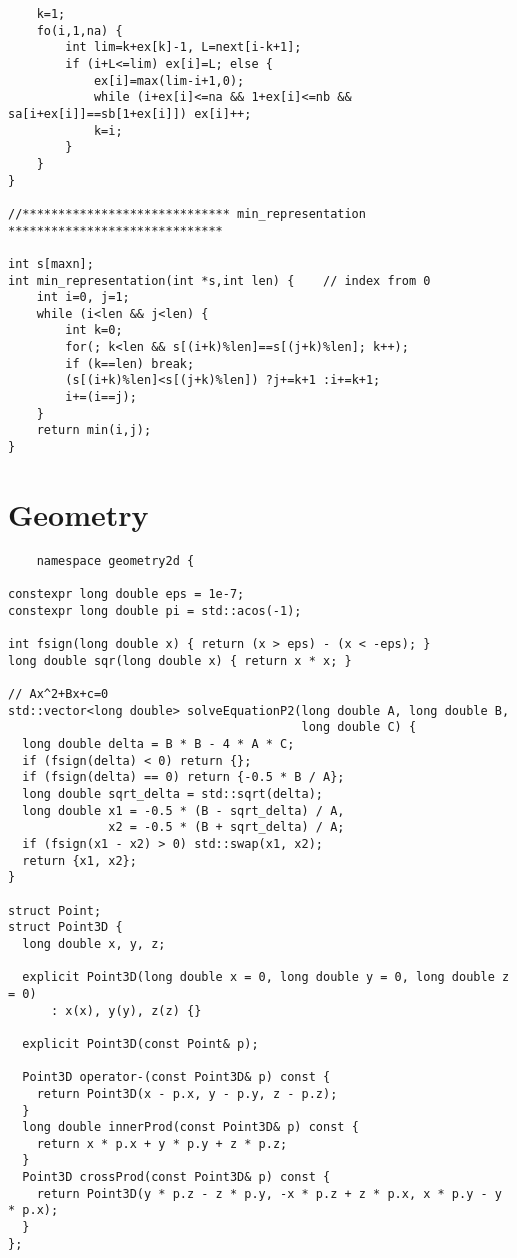 \documentclass{article}
\begin{document}
\begin{multicols}{2}
\begin{lstlisting}
    k=1;
    fo(i,1,na) {
        int lim=k+ex[k]-1, L=next[i-k+1];
        if (i+L<=lim) ex[i]=L; else {
            ex[i]=max(lim-i+1,0);
            while (i+ex[i]<=na && 1+ex[i]<=nb && sa[i+ex[i]]==sb[1+ex[i]]) ex[i]++;
            k=i;
        }
    }
}

//***************************** min_representation ******************************

int s[maxn];
int min_representation(int *s,int len) {    // index from 0
    int i=0, j=1;
    while (i<len && j<len) {
        int k=0;
        for(; k<len && s[(i+k)%len]==s[(j+k)%len]; k++);
        if (k==len) break;
        (s[(i+k)%len]<s[(j+k)%len]) ?j+=k+1 :i+=k+1;
        i+=(i==j);
    }
    return min(i,j);
}
\end{lstlisting}

  \section{Geometry}

  \begin{lstlisting}
    namespace geometry2d {

constexpr long double eps = 1e-7;
constexpr long double pi = std::acos(-1);

int fsign(long double x) { return (x > eps) - (x < -eps); }
long double sqr(long double x) { return x * x; }

// Ax^2+Bx+c=0
std::vector<long double> solveEquationP2(long double A, long double B,
                                         long double C) {
  long double delta = B * B - 4 * A * C;
  if (fsign(delta) < 0) return {};
  if (fsign(delta) == 0) return {-0.5 * B / A};
  long double sqrt_delta = std::sqrt(delta);
  long double x1 = -0.5 * (B - sqrt_delta) / A,
              x2 = -0.5 * (B + sqrt_delta) / A;
  if (fsign(x1 - x2) > 0) std::swap(x1, x2);
  return {x1, x2};
}

struct Point;
struct Point3D {
  long double x, y, z;

  explicit Point3D(long double x = 0, long double y = 0, long double z = 0)
      : x(x), y(y), z(z) {}

  explicit Point3D(const Point& p);

  Point3D operator-(const Point3D& p) const {
    return Point3D(x - p.x, y - p.y, z - p.z);
  }
  long double innerProd(const Point3D& p) const {
    return x * p.x + y * p.y + z * p.z;
  }
  Point3D crossProd(const Point3D& p) const {
    return Point3D(y * p.z - z * p.y, -x * p.z + z * p.x, x * p.y - y * p.x);
  }
};


\end{lstlisting}
\end{multicols}
\end{document}
